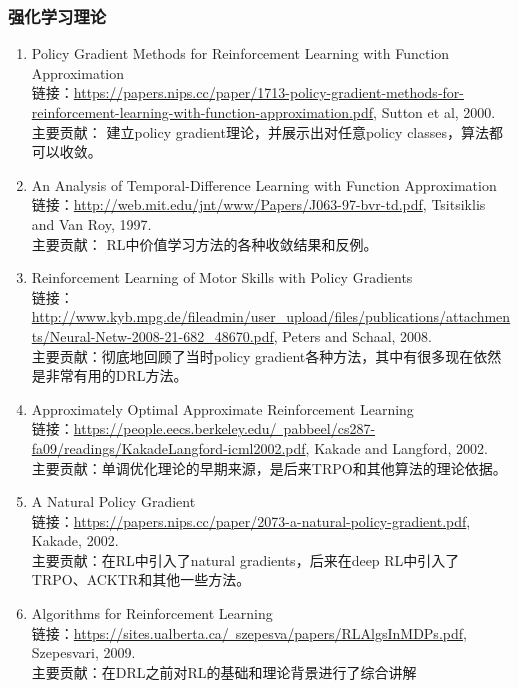 \documentclass[lang=cn,11pt,a4paper]{eleganttemplate}
\begin{document}
\subsubsection{强化学习理论}
\begin{enumerate}
    \item Policy Gradient Methods for Reinforcement Learning with Function Approximation \\
    链接：\href{https://papers.nips.cc/paper/1713-policy-gradient-methods-for-reinforcement-learning-with-function-approximation.pdf}{https://papers.nips.cc/paper/1713-policy-gradient-methods-for-reinforcement-learning-with-function-approximation.pdf}, Sutton et al, 2000. \\
    主要贡献： 建立policy gradient理论，并展示出对任意policy classes，算法都可以收敛。
    \item An Analysis of Temporal-Difference Learning with Function Approximation \\
    链接：\href{http://web.mit.edu/jnt/www/Papers/J063-97-bvr-td.pdf}{http://web.mit.edu/jnt/www/Papers/J063-97-bvr-td.pdf}, Tsitsiklis and Van Roy, 1997. \\
    主要贡献： RL中价值学习方法的各种收敛结果和反例。
    \item Reinforcement Learning of Motor Skills with Policy Gradients \\
    链接：\href{http://www.kyb.mpg.de/fileadmin/user_upload/files/publications/attachments/Neural-Netw-2008-21-682_48670.pdf}{http://www.kyb.mpg.de/fileadmin/user\_upload/files/publications/attachments/Neural-Netw-2008-21-682\_48670.pdf}, Peters and Schaal, 2008. \\
    主要贡献：彻底地回顾了当时policy gradient各种方法，其中有很多现在依然是非常有用的DRL方法。
    \item Approximately Optimal Approximate Reinforcement Learning \\
    链接：\href{https://people.eecs.berkeley.edu/~pabbeel/cs287-fa09/readings/KakadeLangford-icml2002.pdf}{https://people.eecs.berkeley.edu/~pabbeel/cs287-fa09/readings/KakadeLangford-icml2002.pdf}, Kakade and Langford, 2002. \\
    主要贡献：单调优化理论的早期来源，是后来TRPO和其他算法的理论依据。
    \item A Natural Policy Gradient  \\
    链接：\href{https://papers.nips.cc/paper/2073-a-natural-policy-gradient.pdf}{https://papers.nips.cc/paper/2073-a-natural-policy-gradient.pdf}, Kakade, 2002. \\
    主要贡献：在RL中引入了natural gradients，后来在deep RL中引入了TRPO、ACKTR和其他一些方法。
    \item Algorithms for Reinforcement Learning  \\
    链接：\href{https://sites.ualberta.ca/~szepesva/papers/RLAlgsInMDPs.pdf}{https://sites.ualberta.ca/~szepesva/papers/RLAlgsInMDPs.pdf}, Szepesvari, 2009. \\
    主要贡献：在DRL之前对RL的基础和理论背景进行了综合讲解
\end{enumerate}
\end{document}
